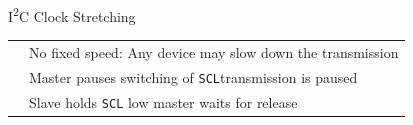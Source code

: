 \documentclass[]{beamer} %
\newcommand{\greenbullet}{\textcolor{bettergreen}\textbullet}
\newcommand{\twi}{I\textsuperscript{2}C\xspace}
\newcommand{\scl}{\texttt{SCL}\xspace}
\newenvironment{changemargin}[2]
{
	\begin{list}{}
		{
			\setlength{\topsep}{0pt}
			\setlength{\leftmargin}{#1}
			\setlength{\rightmargin}{#2}
			\setlength{\listparindent}{\parindent}
		\setlength{\itemindent}{\parindent}
			\setlength{\parsep}{\parskip}
		}
	\item[]
	}
	{
	\end{list}
}
\begin{document}
\begin{frame}[fragile]{\twi Clock Stretching}
		\begin{minipage}[c][.4\textheight][c]{\linewidth}
			\begin{tabular}{p{0.15cm} l}
				\greenbullet & No fixed speed: Any device may slow down the transmission\\
				\greenbullet & Master pauses switching of \scl \textrightarrow transmission is paused\\
				\greenbullet & Slave holds \scl low \textrightarrow master waits for release\\
			\end{tabular}
		\end{minipage}
	\begin{changemargin}{-0.5cm}{+1cm}

\end{changemargin}
\end{frame}
\end{document}
